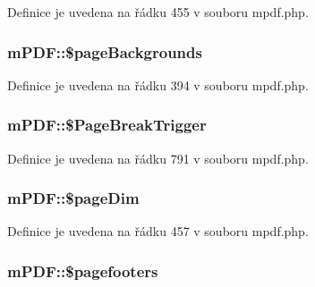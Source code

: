 Definice je uvedena na řádku 455 v souboru mpdf.\-php.

\hypertarget{classm_p_d_f_aa0ebc85162d4388a9d02677b6c4d416d}{
\subsubsection[{\$page\-Backgrounds}]{\setlength{\rightskip}{0pt plus 5cm}m\-P\-D\-F\-::\$page\-Backgrounds}}\label{classm_p_d_f_aa0ebc85162d4388a9d02677b6c4d416d}


Definice je uvedena na řádku 394 v souboru mpdf.\-php.

\hypertarget{classm_p_d_f_a93ac521ff21aa18b70e70656b93cab10}{
\subsubsection[{\$\-Page\-Break\-Trigger}]{\setlength{\rightskip}{0pt plus 5cm}m\-P\-D\-F\-::\$\-Page\-Break\-Trigger}}\label{classm_p_d_f_a93ac521ff21aa18b70e70656b93cab10}


Definice je uvedena na řádku 791 v souboru mpdf.\-php.

\hypertarget{classm_p_d_f_add72cfc958a07b95d38cc6012f7d6dc6}{
\subsubsection[{\$page\-Dim}]{\setlength{\rightskip}{0pt plus 5cm}m\-P\-D\-F\-::\$page\-Dim}}\label{classm_p_d_f_add72cfc958a07b95d38cc6012f7d6dc6}


Definice je uvedena na řádku 457 v souboru mpdf.\-php.

\hypertarget{classm_p_d_f_a9bddc60676030be400c5d66f1caf4ca4}{
\subsubsection[{\$pagefooters}]{\setlength{\rightskip}{0pt plus 5cm}m\-P\-D\-F\-::\$pagefooters}}\label{classm_p_d_f_a9bddc60676030be400c5d66f1caf4ca4}



